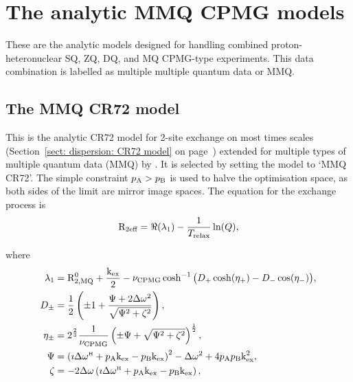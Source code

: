 
\section{The analytic MMQ CPMG models}
\label{sect: dispersion: analytic MMQ CPMG models}

These are the analytic models designed for handling combined proton-heteronuclear SQ, ZQ, DQ, and MQ CPMG-type experiments.
This data combination is labelled as multiple multiple quantum data or MMQ.



\subsection{The MMQ CR72 model}
\label{sect: dispersion: MMQ CR72 model}

This is the analytic CR72 model for 2-site exchange on most times scales (Section~\ref{sect: dispersion: CR72 model} on page~\pageref{sect: dispersion: CR72 model}) extended for multiple types of multiple quantum data (MMQ) by \citet{Korzhnev04a}.
It is selected by setting the model to `MMQ CR72'.
The simple constraint $p_{\textrm{A}} > p_{\textrm{B}}$ is used to halve the optimisation space, as both sides of the limit are mirror image spaces.
The equation for the exchange process is 
\begin{equation}
    \mathrm{R}_{\textrm{2eff}} = \Re(\lambda_1) - \frac{1}{T_{\textrm{relax}}}\ln(Q),
\end{equation}

where
\begin{align}
    \lambda_1  &= \mathrm{R}_{\mathrm{2,MQ}}^0 + \frac{\textrm{k}_{\textrm{ex}}}{2} - \nu_{\textrm{CPMG}}\cosh^{-1} \big( D_+\cosh(\eta_+) - D_-\cos(\eta_-) \big), \\
    D_{\pm}    &= \frac{1}{2} \left( \pm1 + \frac{\Psi + 2\Delta\omega^2}{\sqrt{\Psi^2 + \zeta^2}} \right) , \\
    \eta_{\pm} &= 2^{\frac{2}{3}}\frac{1}{\nu_{\textrm{CPMG}}} \left( \pm\Psi + \sqrt{\Psi^2 + \zeta^2} \right)^{\frac{1}{2}} , \\
    \Psi       &= \left( \imath \Delta\omega^{\scriptscriptstyle\mathrm{H}} + p_{\textrm{A}}\textrm{k}_{\textrm{ex}} - p_{\textrm{B}}\textrm{k}_{\textrm{ex}} \right)^2 - \Delta\omega^2 + 4p_{\textrm{A}}p_{\textrm{B}}\textrm{k}_{\textrm{ex}}^2 , \\
    \zeta      &= -2\Delta\omega \left( \imath \Delta\omega^{\scriptscriptstyle\mathrm{H}} + p_{\textrm{A}}\textrm{k}_{\textrm{ex}} - p_{\textrm{B}}\textrm{k}_{\textrm{ex}} \right),
\end{align}

